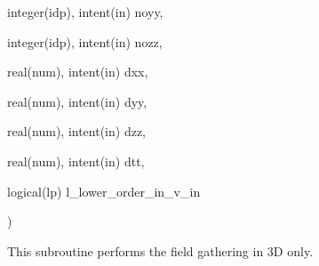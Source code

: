 {\begin{DoxyParamCaption}
\item[{integer(idp), intent(in)}]{noyy, }
\item[{integer(idp), intent(in)}]{nozz, }
\item[{real(num), intent(in)}]{dxx, }
\item[{real(num), intent(in)}]{dyy, }
\item[{real(num), intent(in)}]{dzz, }
\item[{real(num), intent(in)}]{dtt, }
\item[{logical(lp)}]{l\+\_\+lower\+\_\+order\+\_\+in\+\_\+v\+\_\+in}
\end{DoxyParamCaption}
)}\hypertarget{field__gathering_8_f90_a331d1bcb6c50afc68081f4c9842d2aea}{}\label{field__gathering_8_f90_a331d1bcb6c50afc68081f4c9842d2aea}


This subroutine performs the field gathering in 3D only. 

